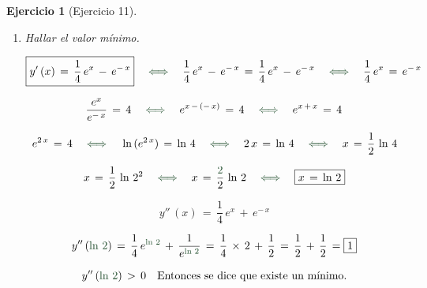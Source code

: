 \documentclass[a4paper,11pt, openany]{book}
\newtheorem{ejer}{Ejercicio}[section]
\newcommand*{\itembolasazules}[1]{%
\footnotesize\protect\tikz[baseline=-3pt]%
\protect\node[scale=.7, circle, shade, ball
color=green]{\color{white}\Large\bf#1};}
\begin{document}
\begin{ejer}[Ejercicio 11]
\begin{enumerate}[label=\itembolasazules{\arabic*}]
$$2\,C_{1}\,=\,\dfrac{1}{2} \quad \textcolor{ao(english)}{\iff} \quad C_{1}\,=\,\dfrac{1}{2\,\textcolor{red}{\times}\,2} \quad \textcolor{ao(english)}{\iff} \quad \boxed{C_{1}\,=\,\dfrac{1}{4}}$$

Sustituyendo $C_{1}$ en la primera ecuación:

$$\textcolor{red}{\dfrac{1}{4}}\,+\,C_{2}\,=\,\dfrac{5}{4} \quad \textcolor{ao(english)}{\iff} \quad C_{2}\,=\,\dfrac{5}{4}\,-\,\textcolor{red}{\dfrac{1}{4}} \quad \textcolor{ao(english)}{\iff} \quad C_{2}\,=\,\dfrac{4}{4} \quad \textcolor{ao(english)}{\iff} \quad \boxed{C_{2}\,=\,1}$$
 
$$\text{Solución particular} \qquad \boxed{y\,(x)\,=\,\dfrac{1}{4}\,e^{x}\,+\,e^{-\,x}}$$

\item Hallar el valor mínimo. 
 
$$\boxed{y'\,(x)\,=\,\dfrac{1}{4}\,e^{x}\,-\,e^{-\,x}} \quad \textcolor{calpolypomonagreen}{\iff} \quad \dfrac{1}{4}\,e^{x}\,-\,e^{-\,x}\,=\, \dfrac{1}{4}\,e^{x}\,-\,e^{-\,x} \quad \textcolor{calpolypomonagreen}{\iff} \quad \dfrac{1}{4}\,e^{x}\,=\,e^{-\,x}$$
 
$$\dfrac{e^{x}}{e^{-\,x}}\,=\,4 \quad \textcolor{calpolypomonagreen}{\iff} \quad e^{x\,-\,(-\,x)}\,=\,4 \quad \textcolor{calpolypomonagreen}{\iff} \quad e^{x\,+\,x}\,=\,4$$
 
$$e^{2\,x}\,=\,4 \quad \textcolor{calpolypomonagreen}{\iff} \quad \ln\,(e^{2\,x})\,=\,\ln\,4 \quad \textcolor{calpolypomonagreen}{\iff} \quad 2\,x\,=\,\ln\,4 \quad \textcolor{calpolypomonagreen}{\iff} \quad x\,=\,\dfrac{1}{2}\,\ln\,4$$
 
$$x\,=\,\dfrac{1}{2}\,\ln\,2^{2} \quad \textcolor{calpolypomonagreen}{\iff} \quad x\,=\,\dfrac{\textcolor{calpolypomonagreen}{2} }{2}\,\ln\,2 \quad \textcolor{calpolypomonagreen}{\iff} \quad \boxed{x\,=\,\ln\,2}$$
 
$$\boxed{y''\,(x)\,=\,\dfrac{1}{4}\,e^{x}\,+\,e^{-\,x}}$$
 
$$y''\,(\textcolor{calpolypomonagreen}{\ln\,2})\,=\,\dfrac{1}{4}\,e^{\textcolor{calpolypomonagreen}{\ln\,2}}\,+\,\dfrac{1}{e^{\textcolor{calpolypomonagreen}{\ln\,2}}}\,=\,\dfrac{1}{4}\,\times\,2\,+\,\dfrac{1}{2}\,=\,\dfrac{1}{2}\,+\,\dfrac{1}{2}\,=\boxed{1}$$
 
$$y''\,(\textcolor{calpolypomonagreen}{\ln\,2})\,>\,0 \quad \text{Entonces se dice que existe un mínimo.}$$
 
\end{enumerate}
 
\end{ejer}
 
\end{document}
